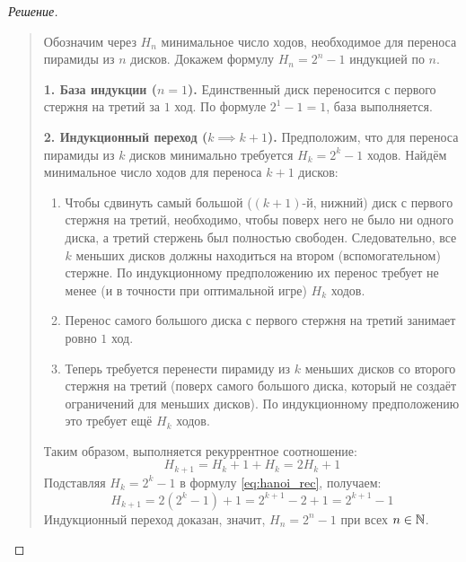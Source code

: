 \begin{proof}[Решение]~\\
    \begin{quote}
        Обозначим через $H_n$ минимальное число ходов, необходимое для 
        переноса пирамиды из $n$ дисков. Докажем формулу $H_n = 2^n - 1$ 
        индукцией по $n$.

        \textbf{1. База индукции ($n = 1$).} Единственный диск переносится 
        с первого стержня на третий за $1$ ход. По формуле $2^1 - 1 = 1$, 
        база выполняется.

        \textbf{2. Индукционный переход ($k \implies k + 1$).} 
        Предположим, что для переноса пирамиды из $k$ дисков минимально 
        требуется $H_k = 2^k - 1$ ходов. Найдём минимальное число ходов 
        для переноса $k + 1$ дисков:
        \begin{enumerate}
            \item Чтобы сдвинуть самый большой ($(k + 1)$-й, нижний) диск 
            с первого стержня на третий, необходимо, чтобы поверх него не 
            было ни одного диска, а третий стержень был полностью свободен. 
            Следовательно, все $k$ меньших дисков должны находиться на 
            втором (вспомогательном) стержне. По индукционному 
            предположению их перенос требует не менее (и в точности при 
            оптимальной игре) $H_k$ ходов.
            \item Перенос самого большого диска с первого стержня на 
            третий занимает ровно $1$ ход.
            \item Теперь требуется перенести пирамиду из $k$ меньших 
            дисков со второго стержня на третий (поверх самого большого 
            диска, который не создаёт ограничений для меньших дисков). 
            По индукционному предположению это требует ещё $H_k$ ходов.
        \end{enumerate}
        Таким образом, выполняется рекуррентное соотношение:
        \begin{equation} \label{eq:hanoi_rec}
            H_{k+1} = H_k + 1 + H_k = 2 H_k + 1 \tag{6}
        \end{equation}
        Подставляя $H_k = 2^k - 1$ в формулу \eqref{eq:hanoi_rec}, получаем:
        \[
            H_{k+1} = 2(2^k - 1) + 1 = 2^{k+1} - 2 + 1 = 2^{k+1} - 1
        \]
        Индукционный переход доказан, значит, $H_n = 2^n - 1$ при всех 
        $n \in \mathbb{N}$.
    \end{quote}
\end{proof}

